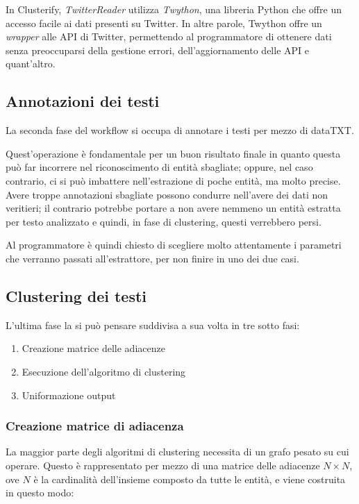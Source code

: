 		In Clusterify, \emph{TwitterReader} utilizza \emph{Twython}, una libreria Python che offre un accesso facile ai dati presenti su Twitter\cite{twython}. In altre parole, Twython offre un \emph{wrapper} alle API di Twitter, permettendo al programmatore di ottenere dati senza preoccuparsi della gestione errori, dell'aggiornamento delle API e quant'altro. 

	\subsection{Annotazioni dei testi}
		La seconda fase del workflow si occupa di annotare i testi per mezzo di dataTXT.
		
		Quest'operazione è fondamentale per un buon risultato finale in quanto questa può far incorrere nel riconoscimento di entità sbagliate; oppure, nel caso contrario, ci si può imbattere nell'estrazione di poche entità, ma molto precise. Avere troppe annotazioni sbagliate possono condurre nell'avere dei dati non veritieri; il contrario potrebbe portare a non avere nemmeno un entità estratta per testo analizzato e quindi, in fase di clustering, questi verrebbero persi.

		Al programmatore è quindi chiesto di scegliere molto attentamente i parametri che verranno passati all'estrattore, per non finire in uno dei due casi.

	\subsection{Clustering dei testi}
		L'ultima fase la si può pensare suddivisa a sua volta in tre sotto fasi:

		\begin{enumerate}
  			\item Creazione matrice delle adiacenze
  			\item Esecuzione dell'algoritmo di clustering
 			\item Uniformazione output
		\end{enumerate} 

		\subsubsection{Creazione matrice di adiacenza}
			La maggior parte degli algoritmi di clustering necessita di un grafo pesato su cui operare. Questo è rappresentato per mezzo di una matrice delle adiacenze $N \times N$, ove $N$ è la cardinalità dell'insieme composto da tutte le entità, e viene costruita in questo modo:

